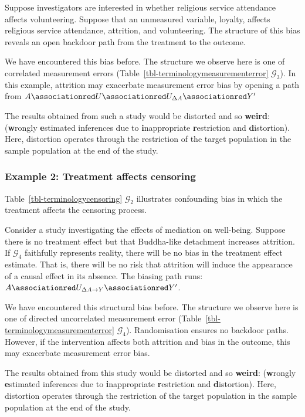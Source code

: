 \documentclass[
  single column]{article}
\begin{document}
Suppose investigators are interested in whether religious service
attendance affects volunteering. Suppose that an unmeasured variable,
loyalty, affects religious service attendance, attrition, and
volunteering. The structure of this bias reveals an open backdoor path
from the treatment to the outcome.

We have encountered this bias before. The structure we observe here is
one of correlated measurement errors
(Table~\ref{tbl-terminologymeasurementerror} \(\mathcal{G}_3\)). In this
example, attrition may exacerbate measurement error bias by opening a
path from
\(A \associationred U \associationred U_{\Delta{A}}  \associationred Y'\)

The results obtained from such a study would be distorted and so
\textbf{weird}: (\textbf{w}rongly \textbf{e}stimated inferences due to
\textbf{i}nappropriate \textbf{r}estriction and \textbf{d}istortion).
Here, distortion operates through the restriction of the target
population in the sample population at the end of the study.

\subsubsection{Example 2: Treatment affects
censoring}\label{example-2-treatment-affects-censoring}

Table~\ref{tbl-terminologycensoring} \(\mathcal{G}_2\) illustrates
confounding bias in which the treatment affects the censoring process.

Consider a study investigating the effects of mediation on well-being.
Suppose there is no treatment effect but that Buddha-like detachment
increases attrition. If \(\mathcal{G}_4\) faithfully represents reality,
there will be no bias in the treatment effect estimate. That is, there
will be no risk that attrition will induce the appearance of a causal
effect in its absence. The biasing path runs:
\(A \associationred U_{\Delta{A\to Y}}  \associationred Y'\).

We have encountered this structural bias before. The structure we
observe here is one of directed uncorrelated measurement error
(Table~\ref{tbl-terminologymeasurementerror} \(\mathcal{G}_4\)).
Randomisation ensures no backdoor paths. However, if the intervention
affects both attrition and bias in the outcome, this may exacerbate
measurement error bias.

The results obtained from this study would be distorted and so
\textbf{weird}: (\textbf{w}rongly \textbf{e}stimated inferences due to
\textbf{i}nappropriate \textbf{r}estriction and \textbf{d}istortion).
Here, distortion operates through the restriction of the target
population in the sample population at the end of the study.
\end{document}
